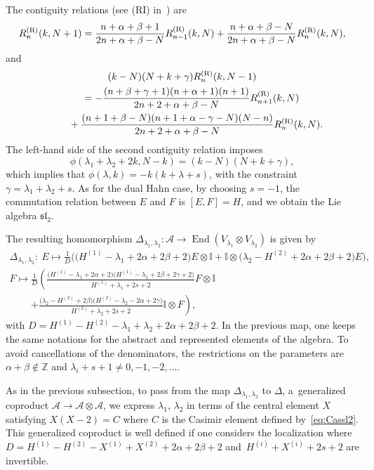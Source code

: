 \documentclass[10pt,a4paper]{amsart}
\numberwithin{equation}{section}
\theoremstyle{definition}
\begin{document}
The contiguity relations (see (RI) in~\cite{contiguity}) are
\[
R^{\rm (R)}_n(k,N+1)=\frac{n+\alpha+\beta+1}{2n+\alpha+\beta-N}R^{\rm (R)}_{n-1}(k,N)+\frac{n+\alpha+\beta-N}{2n+\alpha+\beta-N}R^{\rm (R)}_n(k,N),
\]
and
\begin{gather*}
(k-N)(N+k+\gamma)R^{\rm (R)}_n(k,N-1)\\
\qquad=-\frac{(n+\beta+\gamma+1)(n+\alpha+1)(n+1)}{2n+2+\alpha+\beta-N}R^{\rm (R)}_{n+1}(k,N)\\
\phantom{\qquad=}{}+\frac{(n+1+\beta-N)(n+1+\alpha-\gamma-N)(N-n)}{2n+2+\alpha+\beta-N}R^{\rm (R)}_n(k,N).
\end{gather*}
The left-hand side of the second contiguity relation imposes
\[\phi(\lambda_1+\lambda_2+2k,N-k)=(k-N)(N+k+\gamma),\]
which implies that
$\phi(\lambda,k)=-k(k+\lambda+s)$,
 with the constraint
$\gamma=\lambda_1+\lambda_2+s$.
As for the dual Hahn case, by choosing $s=-1$, the commutation relation between $E$ and $F$ is
$[E,F]=H$,
and we obtain the Lie algebra $\mathfrak{sl}_2$.


The resulting homomorphism $\Delta_{\lambda_1,\lambda_2}\colon \mathcal{A} \to \operatorname{End}(V_{\lambda_1}\otimes V_{\lambda_2})$ is given by
\begin{gather*}
\Delta_{\lambda_1,\lambda_2}\colon\ E\mapsto \frac{1}{D}\bigl(\bigl(H^{(1)}-\lambda_1+2\alpha+2\beta+2\bigr)E\otimes \mathbb{I}+\mathbb{I}\otimes \bigl(\lambda_2-H^{(2)}+2\alpha+2\beta+2\bigr)E\bigr),\\
 F\mapsto \frac{1}{D}\left(\frac{\bigl(H^{(1)}-\lambda_1+2\alpha+2\bigr)\bigl(H^{(1)}-\lambda_1+2\beta+2\gamma+2\bigr)}{H^{(1)}+\lambda_1+2s+2}F\otimes \mathbb{I}\right. \\
 \phantom{ F\mapsto }{}\left. +\frac{\bigl(\lambda_2-H^{(2)}+2\beta\bigr)\bigl(H^{(2)}-\lambda_2-2\alpha+2\gamma\bigr)}{H^{(2)}+\lambda_2+2s+2}\mathbb{I}\otimes F\right),\end{gather*}
with $D=H^{(1)}-H^{(2)}-\lambda_1+\lambda_2+2\alpha+2\beta+2$. In the previous map, one keeps the same notations for the abstract and represented elements of the algebra. To avoid cancellations of the denominators, the restrictions on the parameters are $\alpha+\beta\notin\mathbb{Z}$ and $\lambda_i+s+1\neq0,-1,-2,\dots $.

As in the previous subsection, to pass from the map $\Delta_{\lambda_1,\lambda_2}$ to $\Delta$, a~generalized coproduct $\mathcal{A}\to \mathcal{A}\otimes\mathcal{A}$, we express $\lambda_1$, $\lambda_2$ in terms of the central element $X$ satisfying $X(X-2)=C$ where $C$ is the Casimir element defined by~\eqref{eq:Cassl2}. This generalized coproduct is well defined if one considers the localization where $D=H^{(1)}-H^{(2)}-X^{(1)}+X^{(2)}+2\alpha+2\beta+2$ and~${H^{(i)}+X^{(i)}+2s+2}$ are invertible.
\end{document}
